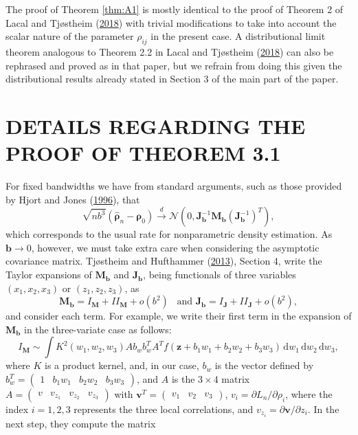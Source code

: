 \documentclass[
  12pt,
  letterpaper]{article}
\numberwithin{equation}{section}
\newcommand{\z}{\bm{z}}
\newcommand{\fv}{\bm{v}}
\newcommand{\frho}{\bm{\rho}}
\newcommand{\hfrho}{\widehat{\bm{\rho}}}
\newcommand{\hh}{\bm{b}}
\newcommand{\Jb}{\bm{J}_{\hh}}
\newcommand{\Mb}{\bm{M}_{\hh}}
\begin{document}
The proof of Theorem \ref{thm:A1} is mostly identical to the proof of Theorem 2 of Lacal and Tjøstheim (\protect\hyperlink{ref-lacal2018estimating}{2018}) with trivial modifications to take into account the scalar nature of the parameter \(\rho_{ij}\) in the present case. A distributional limit theorem analogous to Theorem 2.2 in Lacal and Tjøstheim (\protect\hyperlink{ref-lacal2018estimating}{2018}) can also be rephrased and proved as in that paper, but we refrain from doing this given the distributional results already stated in Section 3 of the main part of the paper.

\hypertarget{app-loccor}{%
\section{DETAILS REGARDING THE PROOF OF THEOREM 3.1}\label{app-loccor}}

For fixed bandwidths we have from standard arguments, such as those provided by Hjort and Jones (\protect\hyperlink{ref-hjort1996locally}{1996}), that
\begin{equation}
\sqrt{nb^3}\left(\hfrho_n - \frho_0\right) \stackrel{d}{\rightarrow} \mathcal{N}(0, \Jb^{-1}\Mb(\Jb^{-1})^T),
\label{eq:fixed-h}
\end{equation}
which corresponds to the usual rate for nonparametric density estimation. As \(\hh\rightarrow0\), however, we must take extra care when considering the asymptotic covariance matrix. Tjøstheim and Hufthammer (\protect\hyperlink{ref-tjostheim2013local}{2013}), Section 4, write the Taylor expansions of \(\Mb\) and \(\Jb\), being functionals of three variables \((x_1, x_2, x_3)\) or \((z_1,z_2,z_3)\), as
\[\Mb = I_{\bm{M}} + II_{\bm{M}} + o(b^2) \,\,\, \textrm{ and } \Jb = I_{\bm{J}} + II_{\bm{J}} + o(b^2),\]
and consider each term. For example, we write their first term in the expansion of \(\Mb\) in the three-variate case as follows:
\[I_{\bm{M}} \sim \int K^2(w_1, w_2, w_3)Ab_wb_w^TA^Tf(\z + b_1w_1 + b_2w_2 + b_3w_3)\,\textrm{d}w_1\,\textrm{d}w_2\,\textrm{d}w_3,\]
where \(K\) is a product kernel, and, in our case, \(b_w\) is the vector defined by \(b_w^T = \begin{pmatrix} 1 & b_1w_1 & b_2w_2 & b_3w_3 \end{pmatrix}\), and \(A\) is the \(3\times 4\) matrix \(A = \begin{pmatrix} v & v_{z_1} & v_{z_2} & v_{z_3}\end{pmatrix}\) with \(\fv^T = \begin{pmatrix} v_1 & v_2 & v_3 \end{pmatrix}\), \(v_i = \partial L_n/\partial \rho_i\), where the index \(i=1,2,3\) represents the three local correlations, and \(v_{z_i} = \partial \fv/\partial z_i\). In the next step, they compute the matrix
\end{document}
